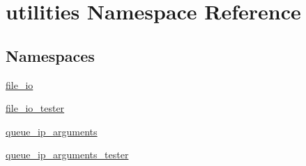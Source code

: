 \hypertarget{namespaceutilities}{}\section{utilities Namespace Reference}
\label{namespaceutilities}
\subsection*{Namespaces}
\begin{DoxyCompactItemize}
\item 
 \hyperlink{namespaceutilities_1_1file__io}{file\+\_\+io}
\item 
 \hyperlink{namespaceutilities_1_1file__io__tester}{file\+\_\+io\+\_\+tester}
\item 
 \hyperlink{namespaceutilities_1_1queue__ip__arguments}{queue\+\_\+ip\+\_\+arguments}
\item 
 \hyperlink{namespaceutilities_1_1queue__ip__arguments__tester}{queue\+\_\+ip\+\_\+arguments\+\_\+tester}
\end{DoxyCompactItemize}
